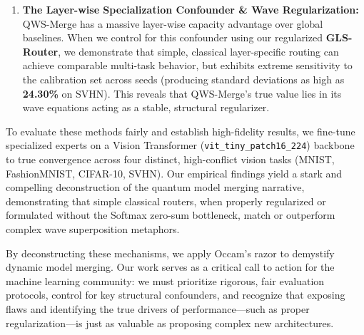 \begin{enumerate}
    \item \textbf{The Layer-wise Specialization Confounder \& Wave Regularization:} QWS-Merge has a massive layer-wise capacity advantage over global baselines. When we control for this confounder using our regularized \textbf{GLS-Router}, we demonstrate that simple, classical layer-specific routing can achieve comparable multi-task behavior, but exhibits extreme sensitivity to the calibration set across seeds (producing standard deviations as high as \textbf{24.30\%} on SVHN). This reveals that QWS-Merge's true value lies in its wave equations acting as a stable, structural regularizer.
\end{enumerate}

To evaluate these methods fairly and establish high-fidelity results, we fine-tune specialized experts on a Vision Transformer (\texttt{vit\_tiny\_patch16\_224}) backbone to true convergence across four distinct, high-conflict vision tasks (MNIST, FashionMNIST, CIFAR-10, SVHN). Our empirical findings yield a stark and compelling deconstruction of the quantum model merging narrative, demonstrating that simple classical routers, when properly regularized or formulated without the Softmax zero-sum bottleneck, match or outperform complex wave superposition metaphors.

By deconstructing these mechanisms, we apply Occam's razor to demystify dynamic model merging. Our work serves as a critical call to action for the machine learning community: we must prioritize rigorous, fair evaluation protocols, control for key structural confounders, and recognize that exposing flaws and identifying the true drivers of performance—such as proper regularization—is just as valuable as proposing complex new architectures.